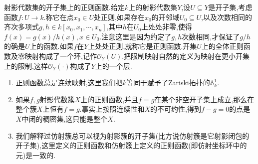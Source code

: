 射影代数集的开子集上的正则函数.给定$k$上的射影代数集$Y$,设$U\subseteq Y$是开子集,考虑函数$f:U\to k$.称它在点$x_0\in U$处正则,如果存在$x_0$的开邻域$U_0\subseteq U$,以及次数相同的齐次多项式$g,h\in k[x_0,x_1,\cdots,x_n]$,其中$h$在$U_0$上处处非零,使得$f(x)=g(x)/h(x),x\in U_0$.注意这里是因为约定了$g,h$次数相同,才保证了$g/h$的确是$U$上的函数.如果$f$在$Y$上处处正则,就称它是正则函数.开集$U$上的全体正则函数及零映射构成了一个环,记作$\mathscr{O}_Y(U)$,把限制映射自然的定义为映射在更小开集上的限制,这样$\mathscr{O}_Y(\cdot)$构成了$Y$上的一个层.
\begin{enumerate}
	\item 正则函数总是连续映射,这里我们把$k$等同于赋予了Zariski拓扑的$\mathbb{A}_k^1$.
	\item 如果$f,g$射影代数簇$X$上的正则函数,并且$f=g$在某个非空开子集上成立,那么在整个簇$X$上恒有$f=g$.事实上按照连续性和$X$的不可约性,得到$f-g=0$的点是$X$中闭的稠密集,这只能是整个$X$.
	\item 我们解释过仿射簇总可以视为射影簇的开子集(比方说仿射簇是它射影闭包的开子集),这里定义的正则函数和仿射簇上定义的正则函数(即仿射坐标环中的元)是一致的.
\end{enumerate}

